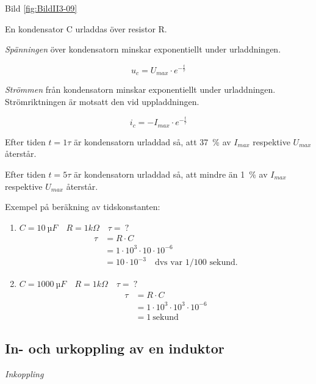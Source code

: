 Bild \ref{fig:BildII3-09}

En kondensator C urladdas över resistor R.

\emph{Spänningen} över kondensatorn minskar exponentiellt under urladdningen.

\[u_c = U_{max} \cdot e^{-\frac{t}{\tau}}\]

\emph{Strömmen} från kondensatorn minskar exponentiellt under urladdningen.
Strömriktningen är motsatt den vid uppladdningen.

\[i_c = - I_{max} \cdot e^{-\frac{t}{\tau}}\]

Efter tiden \(t = 1\tau\) är kondensatorn urladdad så, att 37~\% av \(I_{max}\)
respektive \(U_{max}\) återstår.

Efter tiden \(t = 5\tau\) är kondensatorn urladdad så, att mindre än 1~\% av
\(I_{max}\) respektive \(U_{max}\) återstår.

Exempel på beräkning av tidskonstanten:
\begin{enumerate}
\item \(C = 10\ µF \quad R = 1 kΩ \quad \tau =\ ?\)
  \begin{align*}
    \tau &= R \cdot C \\
    &= 1 \cdot 10^3 \cdot 10 \cdot 10^{-6} \\
    &= 10 \cdot 10^{-3} \quad \text{dvs var 1/100 sekund.}
  \end{align*}
\item \(C = 1000\ µF \quad R = 1 kΩ \quad \tau =\ ?\)
  \begin{align*}
    \tau &= R \cdot C \\
    &= 1 \cdot 10^3 \cdot 10^3 \cdot 10^{-6} \\
    &= 1\ \text{sekund}
  \end{align*}
\end{enumerate}

\subsection{In- och urkoppling av en induktor}

\emph{Inkoppling}

